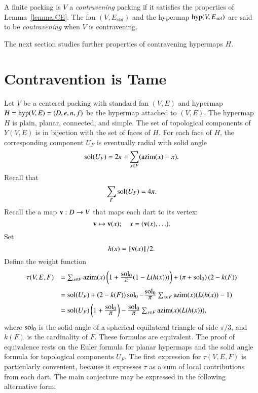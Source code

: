 \begin{definition}[contravening]
A finite packing is $V$ a {\it contravening} packing if it satisfies the properties
of Lemma~\ref{lemma:CE}.  The fan $(V,E_{std})$ and the hypermap ${\operatorname{hyp}}(V,E_{std})$ are said
to be {\it contravening} when $V$ is contravening.
%
%
\end{definition}



The next section studies further properties of contravening hypermaps $H$.



\section{Contravention is Tame}
%
    \label{sec:contraproof}

Let $V$ be a centered packing with
standard fan $(V,E)$ and hypermap $H={\operatorname{hyp}}(V,E)=(D,e,n,f)$
be the hypermap attached to $(V,E)$.
The hypermap $H$ is plain, planar, connected, and simple.
The set of topological components of $Y(V,E)$ is in bijection with
the set of faces of $H$.  
%
For each face of $H$, the corresponding component $U_F$
is eventually radial with solid
angle
%
  $$
  \operatorname{sol}(U_F) = 2\pi + \sum_{x\in F} ({\operatorname{azim}}(x) -\pi).
  $$
Recall that
    $$\sum_{F} \operatorname{sol}(U_F) = 4\pi.$$
Recall the a map ${\mathbf v}:D\to V$ that maps each dart to its vertex:
$$
{\mathbf v} \mapsto {\mathbf v}(x); \quad   x = ({\mathbf v}(x),\ldots).
$$
Set 
$$h(x) = {{\hskip0.1em|\hskip-0.15em|\hskip0.1em}{\mathbf v}(x){\hskip0.1em|\hskip-0.15em|\hskip0.1em}}/2.$$
Define the weight function
\begin{equation}
\begin{array}{lll}
\tau(V,E,F) &=\sum_{x\in F} \op{azim}(x)\left(1 + \dfrac{\sol_0}{\pi}(1- L(h(x)))\right) + \left(\pi+{\sol_0}\right) (2- k(F))\vspace{6pt}\\
  &= \sol(U_F) + (2- k(F))\sol_0 - \dfrac{\sol_0}{\pi}\sum_{x\in F}\op{azim}(x) (L(h(x)) - 1)\vspace{6pt}\\
&= \sol(U_F) \left( 1 + \dfrac{\sol_0}{\pi}\right) - \dfrac{\sol_0}{\pi} \sum_{x\in F} \op{azim}(x)(L(h(x))),\\
\end{array}
\end{equation}
where $\operatorname{sol}_0$ is the solid angle of a spherical equilateral triangle of side $\pi/3$, and $k(F)$ is the cardinality of $F$.
% 
These formulas are equivalent.  The proof of equivalence rests on the Euler formula for planar hypermaps and the solid angle formula for topological components $U_F$.
The first expression for $\tau(V,E,F)$ is particularly convenient, because it expresses $\tau$ as a sum of local contributions from each dart.
%
%
%
The main conjecture may be expressed in the following alternative form:

